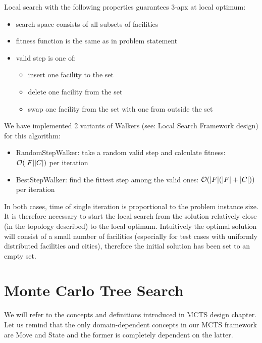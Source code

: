 Local search with the following properties
guarantees\cite{FacilityLS} %
3-apx at local optimum:
\begin{itemize}
\item search space consists of all subsets of facilities
\item fitness function is the same as in problem statement
\item valid step is one of:
	\begin{itemize}
	\item insert one facility to the set
	\item delete one facility from the set
	\item swap one facility from the set with one from outside the set
	\end{itemize}
\end{itemize}

We have implemented 2 variants of Walkers (see: Local Search Framework design)
for this algorithm:
\begin{itemize}
\item RandomStepWalker: take a random valid step and calculate fitness: $\mathcal{O}(|F||C|)$ per iteration
\item BestStepWalker: find the fittest step among the valid ones: $\mathcal{O}(|F|(|F|+|C|))$ per iteration
\end{itemize}

In both cases, time of single iteration is proportional to the problem
instance size. It is therefore necessary to start the local search from
the solution relatively close (in the topology described) to the local
optimum. Intuitively the optimal solution will consist of a small number
of facilities (especially for test cases with uniformly distributed facilities and cities),
therefore the initial solution has been set to an empty set.

\section{\label{MCTS_FL}Monte Carlo Tree Search}

We will refer to the concepts and definitions introduced in MCTS design
chapter. Let us remind that the only domain-dependent concepts in our MCTS
framework are Move and State and the former is completely dependent on the
latter.


